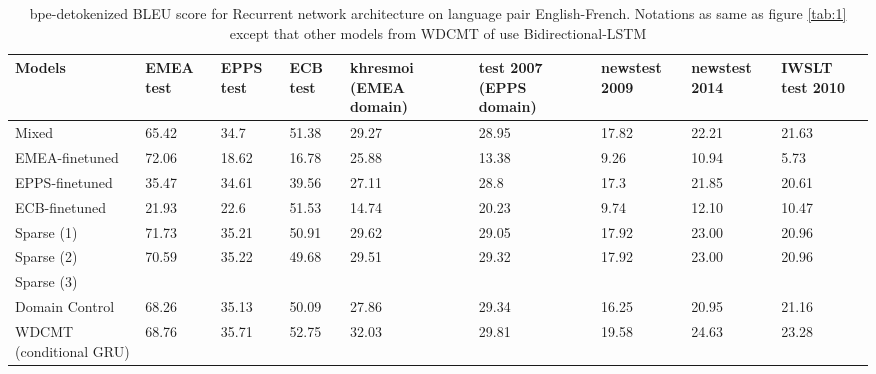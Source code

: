 \documentclass[11pt,a4paper]{article}
\begin{document}
\begin{table}
\begin{center}
 \begin{tabularx}{\textwidth}{|| X | X | X | X | X | X | X | X | X ||} 
 \hline
 Models & EMEA test & EPPS test & ECB test & khresmoi (EMEA domain) & test 2007 (EPPS domain) & newstest 2009 & newstest 2014 & IWSLT test 2010 \\ [0.5ex] 
 \hline\hline
 Mixed & 65.42 & 34.7 & 51.38 & 29.27 & 28.95 & 17.82 & 22.21 & 21.63 \\
 \hline
 EMEA-finetuned  & 72.06 & 18.62 & 16.78 & 25.88 & 13.38 & 9.26 & 10.94 & 5.73 \\
 \hline
 EPPS-finetuned & 35.47 & 34.61 & 39.56 & 27.11 & 28.8 & 17.3 & 21.85 & 20.61 \\
 \hline
 ECB-finetuned & 21.93 & 22.6 & 51.53 & 14.74 & 20.23 & 9.74 & 12.10 & 10.47 \\
 \hline
 Sparse (1) & 71.73 & 35.21 & 50.91 & 29.62 & 29.05 & 17.92 & 23.00 & 20.96 \\
 \hline
 Sparse (2) & 70.59 & 35.22 & 49.68 & 29.51 & 29.32 & 17.92 & 23.00 & 20.96 \\
 \hline
 Sparse (3) &  &  &  &  &  &  &  & \\
 \hline
 Domain Control & 68.26 & 35.13 & 50.09 & 27.86 & 29.34 & 16.25 & 20.95 & 21.16 \\
 \hline
 WDCMT (conditional GRU) & 68.76 & 35.71 & 52.75 & 32.03 & 29.81 & 19.58 & 24.63 & 23.28 \\
 \hline 
\end{tabularx}
\end{center}
\caption{bpe-detokenized BLEU score for Recurrent network architecture on language pair English-French. Notations as same as figure \ref{tab:1} except that other models from WDCMT of \cite{Zeng18multidomain} use Bidirectional-LSTM}
\label{tab:3}
\end{table}
\end{document}
